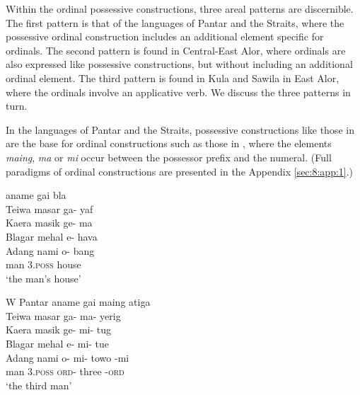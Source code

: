 Within the ordinal possessive constructions, three areal patterns are discernible. The first pattern is that of the languages of Pantar and the Straits, where the possessive ordinal construction includes an additional element specific for ordinals. The second pattern is found in Central-East Alor, where ordinals are also expressed like possessive constructions, but without including an additional ordinal element. The third pattern is found in Kula and Sawila in East Alor, where the ordinals involve an applicative verb. We discuss the three patterns in turn.

In the languages of Pantar and the Straits, possessive constructions like those in  are the base for ordinal constructions such as those in , where the elements \textit{maing}, \textit{ma} or \textit{mi} occur between the possessor prefix and the numeral. (Full paradigms of ordinal constructions are presented in the Appendix \ref{sec:8:app:1}.) 


\let\eachwordone=\itshape
\let\eachwordtwo=\itshape
\let\eachwordthree=\itshape
\let\eachwordfour=\itshape
\let\eachwordfive=\itshape 

\ea\label{bkm:Ref342649616}
    aname    gai    bla\\
  {\upshape Teiwa}      masar    ga-    yaf\\
  {\upshape Kaera}      masik    ge-    ma\\
  {\upshape Blagar}      mehal    {\textglotstop}e-    hava\\
  {\upshape Adang}       nami    o-    bang\\
   { }        man   \textsc{3.poss}  house  \\
\glt `the man's house'  \\ 
\z

\ea
\label{bkm:Ref342649632}
\gllllll
      {\upshape W Pantar}     aname  gai  maing  atiga \\  
      {\upshape Teiwa}          masar  ga-  ma-  yerig \\
      {\upshape Kaera}          masik  ge-  mi-  tug \\
      {\upshape Blagar}         mehal {\textglotstop}e-  mi-  tue  \\
      {\upshape Adang}          nami  o-  mi-  towo  {}-mi \\      
      { }            man \textsc{3.poss}  \textsc{ord-} three  -\textsc{ord} \\
\glt  `the third man'
\z

